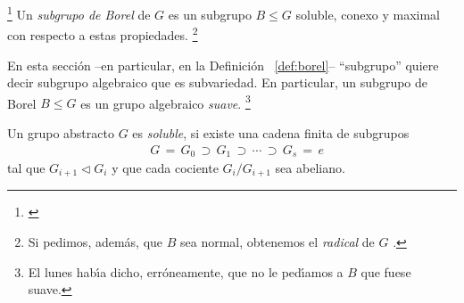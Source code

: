 \begin{defBorel}\label{def:borel}
	\footnote{
		\cite[Definition~17.6]{MilneAlgebraicGroups}
	}
	Un \emph{subgrupo de Borel} de $G$ es un subgrupo $B\leq G$ soluble,
	conexo y maximal con respecto a estas propiedades.%
	\footnote{
		Si pedimos, adem\'{a}s, que $B$ sea normal, obtenemos el
		\emph{radical} de $G$
		\cite[Definition~1.14]{GetzHahnAutomorphicRepresentations}.
	}
\end{defBorel}

\begin{obsBorel}\label{obs:def:borel}
	En esta secci\'{o}n --en particular, en la Definici\'{o}n~%
	\ref{def:borel}-- ``subgrupo'' quiere decir subgrupo algebraico que
	es subvariedad. En particular, un subgrupo de Borel $B\leq G$ es un
	grupo algebraico \emph{suave}.%
	\footnote{
		El lunes hab\'{\i}a dicho, err\'{o}neamente, que no le
		ped\'{\i}amos a $B$ que fuese suave.
	}
\end{obsBorel}

Un grupo abstracto $G$ es \emph{soluble}, si existe una cadena finita de
subgrupos
\begin{align*}
	& G \,=\, G_0\,\supset\,G_1\,\supset\,\cdots\,\supset\,G_s\,=\,e
\end{align*}
%
tal que $G_{i+1}\triangleleft G_i$ y que cada cociente $G_i/G_{i+1}$ sea
abeliano.

